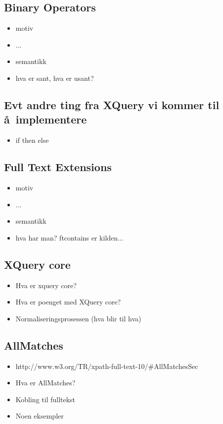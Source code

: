 \subsection{Binary Operators}

\begin{itemize}
\item motiv
\item ...
\item semantikk
\item hva er sant, hva er usant?
\end{itemize}

\subsection{Evt andre ting fra XQuery vi kommer til \aa~implementere}

\begin{itemize}
\item if then else

\end{itemize}

\subsection{Full Text Extensions}

\begin{itemize}
\item motiv
\item ...
\item semantikk
\item hva har man? ftcontains er kilden...
\end{itemize}

\subsection{XQuery core}
\begin{itemize}
  \item Hva er xquery core?
  \item Hva er poenget med XQuery core?
  \item Normaliseringsprosessen (hva blir til hva)
\end{itemize}

\subsection{AllMatches}
\begin{itemize}
  \item http://www.w3.org/TR/xpath-full-text-10/\#AllMatchesSec
  \item Hva er AllMatches?
  \item Kobling til fulltekst
  \item Noen eksempler
\end{itemize}